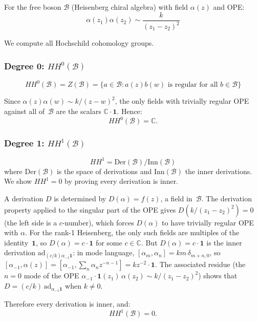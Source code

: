 \begin{example}\label{ex:HH-heisenberg-complete}
For the free boson $\mathcal{B}$ (Heisenberg chiral algebra) with field $\alpha(z)$ and OPE:
\[\alpha(z_1)\alpha(z_2) \sim \frac{k}{(z_1 - z_2)^2}\]

We compute all Hochschild cohomology groups.

\subsubsection{\texorpdfstring{Degree 0: $HH^0(\mathcal{B})$}{Degree 0: HH 0(B)}}

\[HH^0(\mathcal{B}) = Z(\mathcal{B}) = \{a \in \mathcal{B} : a(z)b(w) \text{ is regular for all } b \in \mathcal{B}\}\]

Since $\alpha(z)\alpha(w) \sim k/(z-w)^2$, the only fields with trivially regular OPE against all of~$\mathcal{B}$ are the scalars $\mathbb{C} \cdot \mathbf{1}$.  Hence:
\[HH^0(\mathcal{B}) = \mathbb{C}.\]

\subsubsection{\texorpdfstring{Degree 1: $HH^1(\mathcal{B})$}{Degree 1: HH 1(B)}}

\[HH^1 = \text{Der}(\mathcal{B})/\text{Inn}(\mathcal{B})\]
where $\text{Der}(\mathcal{B})$ is the space of derivations and $\text{Inn}(\mathcal{B})$ the inner derivations.  We show $HH^1 = 0$ by proving every derivation is inner.

A derivation $D$ is determined by $D(\alpha) = f(z)$, a field in~$\mathcal{B}$.  The derivation property applied to the singular part of the OPE gives $D(k/(z_1-z_2)^2) = 0$ (the left side is a $c$-number), which forces $D(\alpha)$ to have trivially regular OPE with $\alpha$.  For the rank-1 Heisenberg, the only such fields are multiples of the identity~$\mathbf{1}$, so $D(\alpha) = c \cdot \mathbf{1}$ for some $c \in \mathbb{C}$.  But $D(\alpha) = c \cdot \mathbf{1}$ is the inner derivation $\mathrm{ad}_{(c/k)\alpha_{-1}\mathbf{1}}$: in mode language, $[\alpha_m, \alpha_n] = km\,\delta_{m+n,0}$, so $[\alpha_{-1}, \alpha(z)] = [\alpha_{-1}, \sum_n \alpha_n z^{-n-1}] = k z^{-2} \cdot \mathbf{1}$.  The associated residue (the $n=0$ mode of the OPE $\alpha_{-1} \cdot \mathbf{1}(z_1)\, \alpha(z_2) \sim k/(z_1-z_2)^2$) shows that $D = (c/k)\,\mathrm{ad}_{\alpha_{-1}\mathbf{1}}$ when $k \neq 0$.

Therefore every derivation is inner, and:
\[HH^1(\mathcal{B}) = 0.\]


\end{example}
